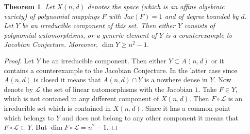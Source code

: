 \documentclass[10pt,a4paper]{amsart}
\newtheorem{theorem}{Theorem}[section]
\begin{document}
\begin{theorem} Let $X(n,d)$ denotes the space (which is an affine algebraic variety) of polynomial mappings $F$ with $Jac(F)=1$ and of degree bounded by $d.$ Let $Y$ be an irreducible component of this set. Then either $Y$ consists of polynomial automorphisms, or a generic element of $Y$ is a counterexample to Jacobian Conjecture. Moreover, $\dim Y \ge n^2-1.$
\end{theorem}

\begin{proof} Let $Y$ be an irreducible component. Then either $Y\subset A(n,d)$ or it contains a counterexample to the Jacobian Conjecture. In the latter case since $A(n,d)$ is closed it means that $A(n,d)\cap Y$ is a nowhere dense in $Y.$ Now denote by $\mathcal L$ the set of linear automorphisms with the Jacobian $1.$ Take $F\in Y$, which is not contaned in any different component of $X(n,d).$
Then $F\circ \mathcal{L}$ is an irreducible set which is contained in $X(n,d).$ Since it has a common point which belongs to $Y$ and does not belong to any other component it means that $F\circ \mathcal{L}\subset Y.$ But $\dim F\circ \mathcal{L}=n^2-1.$
\end{proof}
\end{document}

